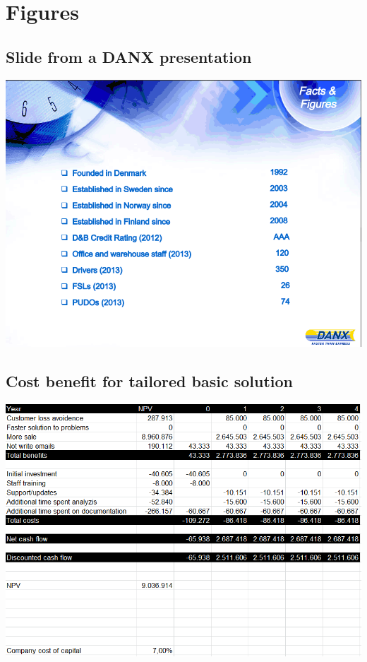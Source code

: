 \chapter{Figures}

\section{Slide from a DANX presentation}
\label{sec:slide_from_DANX}
\includegraphics[scale=0.75]{img/DANX_FSL_PUDO}


\section{Cost benefit for tailored basic solution}
\includegraphics[scale=0.72]{img/CostBenefit_TailoredBasic}


